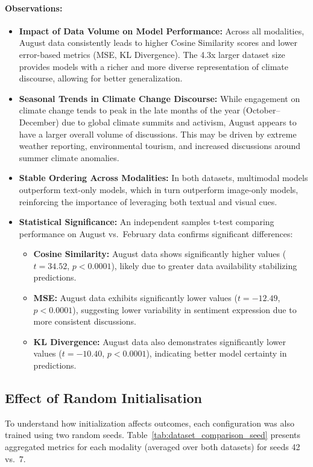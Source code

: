 \paragraph{Observations:} 
\begin{itemize} 
    \item \textbf{Impact of Data Volume on Model Performance:} Across all modalities, August data consistently leads to higher Cosine Similarity scores and lower error-based metrics (MSE, KL Divergence). The 4.3x larger dataset size provides models with a richer and more diverse representation of climate discourse, allowing for better generalization. 
    \item \textbf{Seasonal Trends in Climate Change Discourse:} While engagement on climate change tends to peak in the late months of the year (October–December) due to global climate summits and activism, August appears to have a larger overall volume of discussions. This may be driven by extreme weather reporting, environmental tourism, and increased discussions around summer climate anomalies. 
    \item \textbf{Stable Ordering Across Modalities:} In both datasets, multimodal models outperform text-only models, which in turn outperform image-only models, reinforcing the importance of leveraging both textual and visual cues. 
    \item \textbf{Statistical Significance:} An independent samples t-test comparing performance on August vs.\ February data confirms significant differences: \begin{itemize} 
        \item \textbf{Cosine Similarity:} August data shows significantly higher values ($t = 34.52$, $p < 0.0001$), likely due to greater data availability stabilizing predictions. 
        \item \textbf{MSE:} August data exhibits significantly lower values ($t = -12.49$, $p < 0.0001$), suggesting lower variability in sentiment expression due to more consistent discussions. 
        \item \textbf{KL Divergence:} August data also demonstrates significantly lower values ($t = -10.40$, $p < 0.0001$), indicating better model certainty in predictions. 
    \end{itemize} 
\end{itemize}



\subsection{Effect of Random Initialisation}
\label{subsec:results_seeds}
To understand how initialization affects outcomes, each configuration was also trained using two random seeds. Table~\ref{tab:dataset_comparison_seed} presents aggregated metrics for each modality (averaged over both datasets) for seeds 42 vs.\ 7.

